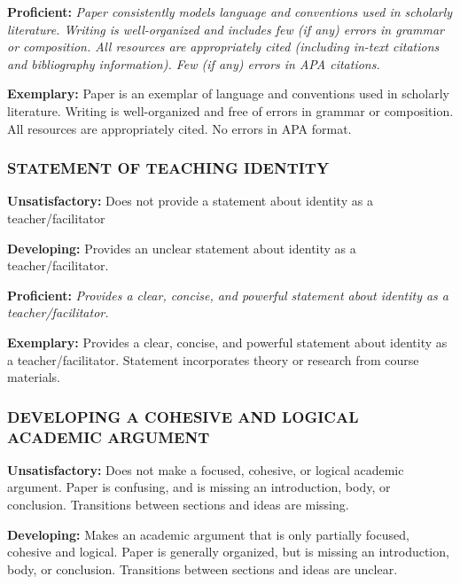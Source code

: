 \documentclass[
]{book}
\begin{document}
\textbf{Proficient:} \emph{Paper consistently models language and conventions used in scholarly literature. Writing is well-organized and includes few (if any) errors in grammar or composition. All resources are appropriately cited (including in-text citations and bibliography information). Few (if any) errors in APA citations.}

\textbf{Exemplary:} Paper is an exemplar of language and conventions used in scholarly literature. Writing is well-organized and free of errors in grammar or composition. All resources are appropriately cited. No errors in APA format.

\hypertarget{statement-of-teaching-identity}{%
\subsubsection*{STATEMENT OF TEACHING IDENTITY}\label{statement-of-teaching-identity}}

\textbf{Unsatisfactory:} Does not provide a statement about identity as a teacher/facilitator

\textbf{Developing:} Provides an unclear statement about identity as a teacher/facilitator.

\textbf{Proficient:} \emph{Provides a clear, concise, and powerful statement about identity as a teacher/facilitator.}

\textbf{Exemplary:} Provides a clear, concise, and powerful statement about identity as a teacher/facilitator. Statement incorporates theory or research from course materials.

\hypertarget{developing-a-cohesive-and-logical-academic-argument}{%
\subsubsection*{DEVELOPING A COHESIVE AND LOGICAL ACADEMIC ARGUMENT}\label{developing-a-cohesive-and-logical-academic-argument}}

\textbf{Unsatisfactory:} Does not make a focused, cohesive, or logical academic argument. Paper is confusing, and is missing an introduction, body, or conclusion. Transitions between sections and ideas are missing.

\textbf{Developing:} Makes an academic argument that is only partially focused, cohesive and logical. Paper is generally organized, but is missing an introduction, body, or conclusion. Transitions between sections and ideas are unclear.
\end{document}
